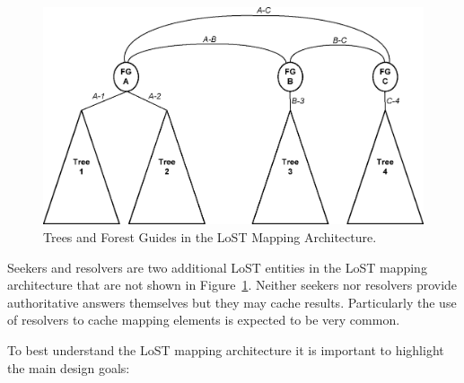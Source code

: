 \documentclass[12pt]{article}
\begin{document}
\begin{figure}[!t]
 \centering
 \includegraphics[scale=0.60]{figures/lost-structure-figure.eps}
 \caption{Trees and Forest Guides in the LoST Mapping Architecture.}
 \label{lost-structure-figure}
\end{figure}

Seekers and resolvers are two additional LoST entities in the LoST mapping architecture that are not shown in Figure~\ref{lost-structure-figure}. Neither seekers nor resolvers provide authoritative answers themselves but they may cache results. Particularly the use of resolvers to cache mapping elements is expected to be very common.

To best understand the LoST mapping architecture it is important to highlight the main design goals:
\end{document}
